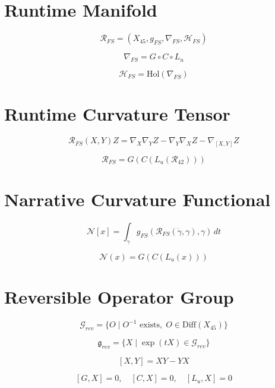 
\section*{Runtime Manifold}

\[
\mathcal{R}_{FS} = (X_{45}, g_{FS}, \nabla_{FS}, \mathcal{H}_{FS})
\]

\[
\nabla_{FS} = G \circ C \circ L_u
\]

\[
\mathcal{H}_{FS} = \mathrm{Hol}(\nabla_{FS})
\]


\section*{Runtime Curvature Tensor}

\[
\mathcal{R}_{FS}(X,Y)Z
= \nabla_X \nabla_Y Z
- \nabla_Y \nabla_X Z
- \nabla_{[X,Y]} Z
\]

\[
\mathcal{R}_{FS}
= G(C(L_u(\mathcal{R}_{42})))
\]


\section*{Narrative Curvature Functional}

\[
\mathcal{N}[x]
= \int_{\gamma}
g_{FS}(\mathcal{R}_{FS}(\dot{\gamma},\gamma), \gamma)\, dt
\]

\[
\mathcal{N}(x)
= G(C(L_u(x)))
\]


\section*{Reversible Operator Group}

\[
\mathcal{G}_{rev}
= \{ O \mid O^{-1} \text{ exists},\;
O \in \mathrm{Diff}(X_{45}) \}
\]

\[
\mathfrak{g}_{rev}
= \{ X \mid \exp(tX) \in \mathcal{G}_{rev} \}
\]

\[
[X,Y] = XY - YX
\]

\[
[G,X] = 0,\quad [C,X] = 0,\quad [L_u,X] = 0
\]

